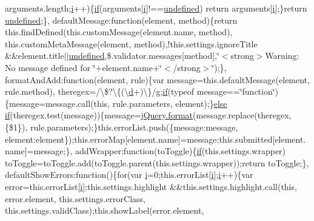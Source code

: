 \begin{DoxyCompactItemize}
arguments.\+length;\hyperlink{jquery_8unobtrusive-ajax_8min_8js_a84da5ff1aa6008a770fb28040f6b0569}{i}++)\{\hyperlink{_scripts_2respond_8min_8js_a93851d60dd037a83509a1757b9ee7b66}{if}(arguments\mbox{[}\hyperlink{jquery_8unobtrusive-ajax_8min_8js_a84da5ff1aa6008a770fb28040f6b0569}{i}\mbox{]}!==\hyperlink{_scripts_2jquery-1_810_82_8js_a08113a236cc18d2a9d5ce27e638012be}{undefined}) return arguments\mbox{[}\hyperlink{jquery_8unobtrusive-ajax_8min_8js_a84da5ff1aa6008a770fb28040f6b0569}{i}\mbox{]};\}return \hyperlink{_scripts_2jquery-1_810_82_8js_a08113a236cc18d2a9d5ce27e638012be}{undefined};\}, default\+Message\+:function(element, method)\{return this.\+find\+Defined(this.\+custom\+Message(element.\+name, method), this.\+custom\+Meta\+Message(element, method),!this.\+settings.\+ignore\+Title \&\&element.\+title$\vert$$\vert$\hyperlink{_scripts_2jquery-1_810_82_8js_a08113a236cc18d2a9d5ce27e638012be}{undefined},\$.validator.\+messages\mbox{[}method\mbox{]},\char`\"{}$<$strong$>$Warning\+: No message defined for \char`\"{}+element.\+name+\char`\"{}$<$/strong$>$\char`\"{});\}, format\+And\+Add\+:function(element, rule)\{var message=this.\+default\+Message(element, rule.\+method), theregex=/\textbackslash{}\$?\textbackslash{}\{(\textbackslash{}\hyperlink{_scripts_2respond_8min_8js_aeb337d295abaddb5ec3cb34cc2e2bbc9}{d}+)\textbackslash{}\}/\hyperlink{jquery_8unobtrusive-ajax_8min_8js_abdf64181dd0fecc8ac45c3cfa81562b1}{g};\hyperlink{_scripts_2respond_8min_8js_a93851d60dd037a83509a1757b9ee7b66}{if}(typeof message==\char`\"{}function\char`\"{})\{message=message.\+call(this, rule.\+parameters, element);\}\hyperlink{_scripts_2jquery_8validate_8js_a0544c3fe466e421738dae463968b70ba}{else} \hyperlink{_scripts_2respond_8min_8js_a93851d60dd037a83509a1757b9ee7b66}{if}(theregex.\+test(message))\{message=\hyperlink{_scripts_2jquery_8validate_8js_a387137c43ed9616d39ba90e890d181eb}{j\+Query.\+format}(message.\+replace(theregex, \textquotesingle{}\{\$1\}\textquotesingle{}), rule.\+parameters);\}this.\+error\+List.\+push(\{message\+:message, element\+:element\});this.\+error\+Map\mbox{[}element.\+name\mbox{]}=message;this.\+submitted\mbox{[}element.\+name\mbox{]}=message;\}, add\+Wrapper\+:function(to\+Toggle)\{\hyperlink{_scripts_2respond_8min_8js_a93851d60dd037a83509a1757b9ee7b66}{if}(this.\+settings.\+wrapper) to\+Toggle=to\+Toggle.\+add(to\+Toggle.\+parent(this.\+settings.\+wrapper));return to\+Toggle;\}, default\+Show\+Errors\+:function()\{for(var \hyperlink{jquery_8unobtrusive-ajax_8min_8js_a84da5ff1aa6008a770fb28040f6b0569}{i}=0;this.\+error\+List\mbox{[}\hyperlink{jquery_8unobtrusive-ajax_8min_8js_a84da5ff1aa6008a770fb28040f6b0569}{i}\mbox{]};\hyperlink{jquery_8unobtrusive-ajax_8min_8js_a84da5ff1aa6008a770fb28040f6b0569}{i}++)\{var error=this.\+error\+List\mbox{[}\hyperlink{jquery_8unobtrusive-ajax_8min_8js_a84da5ff1aa6008a770fb28040f6b0569}{i}\mbox{]};this.\+settings.\+highlight \&\&this.\+settings.\+highlight.\+call(this, error.\+element, this.\+settings.\+error\+Class, this.\+settings.\+valid\+Class);this.\+show\+Label(error.\+element, 
\end{DoxyCompactItemize}
